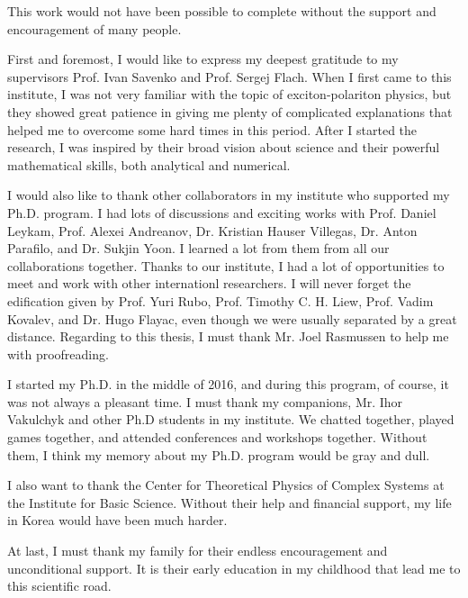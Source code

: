 \begin{acknowledgements}
This work would not have been possible to complete without the support and encouragement of many people.

First and foremost, I would like to express my deepest gratitude to my supervisors Prof. Ivan Savenko and Prof. Sergej Flach.
When I first came to this institute, I was not very familiar with the topic of exciton-polariton physics, but they showed great patience in giving me plenty of complicated explanations that helped me to overcome some hard times in this period.
After I started the research, I was inspired by their broad vision about science and their powerful mathematical skills, both analytical and numerical.

I would also like to thank other collaborators in my institute who supported my Ph.D. program.
I had lots of discussions and exciting works with Prof. Daniel Leykam, Prof. Alexei Andreanov, Dr. Kristian Hauser Villegas, Dr. Anton Parafilo, and Dr. Sukjin Yoon.
I learned a lot from them from all our collaborations together.
Thanks to our institute, I had a lot of opportunities to meet and work with other internationl researchers.
I will never forget the edification given by Prof. Yuri Rubo, Prof. Timothy C. H. Liew, Prof. Vadim Kovalev, and Dr. Hugo Flayac, even though we were usually separated by a great distance.
Regarding to this thesis, I must thank Mr. Joel Rasmussen to help me with proofreading.

I started my Ph.D. in the middle of 2016, and during this program, of course, it was not always a pleasant time.
I must thank my companions, Mr. Ihor Vakulchyk and other Ph.D students in my institute.
We chatted together, played games together, and attended conferences and workshops together.
Without them, I think my memory about my Ph.D. program would be gray and dull.

I also want to thank the Center for Theoretical Physics of Complex Systems at the Institute for Basic Science.
Without their help and financial support, my life in Korea would have been much harder.

At last, I must thank my family for their endless encouragement and unconditional support.
It is their early education in my childhood that lead me to this scientific road.
\end{acknowledgements}
